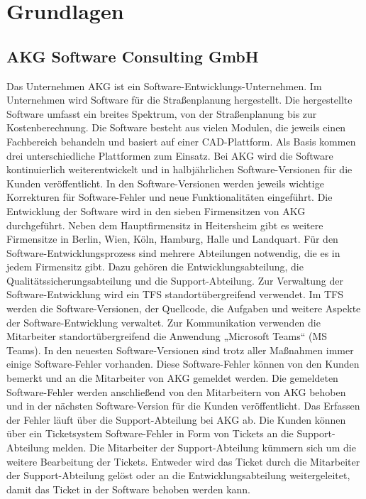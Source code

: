 \section{Grundlagen}
\label{sec:Grundlagen}

\subsection{AKG Software Consulting GmbH}
Das Unternehmen AKG ist ein Software-Entwicklungs-Unternehmen. Im Unternehmen wird Software für die Straßenplanung hergestellt. Die hergestellte Software umfasst ein breites Spektrum, von der Straßenplanung bis zur Kostenberechnung. Die Software besteht aus vielen Modulen, die jeweils einen Fachbereich behandeln und basiert auf
einer CAD-Plattform. Als Basis kommen drei unterschiedliche Plattformen zum Einsatz. Bei AKG wird die Software kontinuierlich weiterentwickelt und in halbjährlichen
Software-Versionen für die Kunden veröffentlicht. In den Software-Versionen werden jeweils wichtige Korrekturen für Software-Fehler und neue Funktionalitäten eingeführt. Die Entwicklung der Software wird in den sieben Firmensitzen von AKG durchgeführt. Neben dem Hauptfirmensitz in Heitersheim gibt es weitere Firmensitze in Berlin, Wien, Köln, Hamburg, Halle und Landquart. Für den Software-Entwicklungsprozess sind mehrere Abteilungen notwendig, die es in jedem Firmensitz gibt. Dazu gehören die Entwicklungsabteilung, die Qualitätssicherungsabteilung und die Support-Abteilung. Zur Verwaltung der Software-Entwicklung wird ein \ac{TFS} standortübergreifend verwendet. Im \ac{TFS} werden die Software-Versionen, der Quellcode, die Aufgaben und weitere Aspekte der Software-Entwicklung verwaltet. Zur Kommunikation verwenden die Mitarbeiter standortübergreifend die Anwendung „Microsoft Teams“ (MS Teams). In den neuesten Software-Versionen sind trotz aller Maßnahmen immer einige Software-Fehler vorhanden. Diese Software-Fehler können von den Kunden bemerkt und an die Mitarbeiter von AKG gemeldet werden. Die gemeldeten Software-Fehler werden anschließend von den Mitarbeitern von AKG behoben und in der nächsten Software-Version für die Kunden veröffentlicht. Das Erfassen der Fehler läuft über die Support-Abteilung bei AKG ab. Die Kunden können über ein Ticketsystem Software-Fehler in Form von Tickets an die Support-Abteilung melden. Die Mitarbeiter der Support-Abteilung kümmern sich um die weitere Bearbeitung der Tickets. Entweder wird das Ticket durch die Mitarbeiter der Support-Abteilung gelöst oder an die Entwicklungsabteilung weitergeleitet, damit das Ticket in der Software behoben werden kann.

